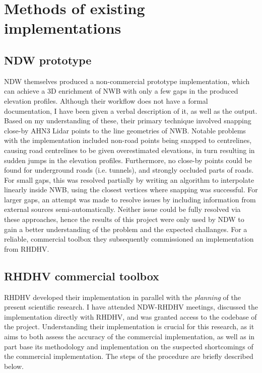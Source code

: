 \section{Methods of existing implementations}
\label{sec:methodsexisting}
\subsection{NDW prototype}

NDW themselves produced a non-commercial prototype implementation, which can achieve a 3D enrichment of NWB with only a few gaps in the produced elevation profiles. Although their workflow does not have a formal documentation, I have been given a verbal description of it, as well as the output. Based on my understanding of these, their primary technique involved snapping close-by AHN3 Lidar points to the line geometries of NWB. Notable problems with the implementation included non-road points being snapped to centrelines, causing road centrelines to be given overestimated elevations, in turn resulting in sudden jumps in the elevation profiles. Furthermore, no close-by points could be found for underground roads (i.e. tunnels), and strongly occluded parts of roads. For small gaps, this was resolved partially by writing an algorithm to interpolate linearly inside NWB, using the closest vertices where snapping was successful. For larger gaps, an attempt was made to resolve issues by including information from external sources semi-automatically. Neither issue could be fully resolved via these approaches, hence the results of this project were only used by NDW to gain a better understanding of the problem and the expected challanges. For a reliable, commercial toolbox they subsequently commissioned an implementation from RHDHV.

\subsection{RHDHV commercial toolbox}

RHDHV developed their implementation in parallel with the \textit{planning} of the present scientific research. I have attended NDW-RHDHV meetings, discussed the implementation directly with RHDHV, and was granted access to the codebase of the project. Understanding their implementation is crucial for this research, as it aims to both assess the accuracy of the commercial implementation, as well as in part base its methodology and implementation on the suspected shortcomings of the commercial implementation. The steps of the procedure are briefly described below.

